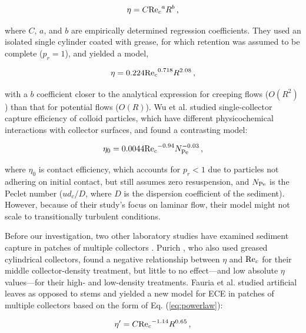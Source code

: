 \documentclass[geosciences,article,submit,moreauthors,pdftex]{Definitions/mdpi}
\begin{document}
\begin{equation}
    \eta=C{\mathrm{Re}_c}^{a}R^{b}\,,
    \label{eq:powerlaw}
\end{equation}

\noindent where $C$, $a$, and $b$ are empirically determined regression coefficients. They used an isolated single cylinder coated with grease, for which retention was assumed to be complete ($p_r = 1$), and yielded a model,

\begin{equation}
    \eta=0.224{\mathrm{Re}_c}^{0.718}R^{2.08}\,,
    \label{eq:palmer}
\end{equation}

\noindent with a $b$ coefficient closer to the analytical expression for creeping flows ($O(R^2)$) than that for potential flows ($O(R)$). Wu et al. \cite{Wu_2011} studied single-collector capture efficiency of colloid particles, which have different physicochemical interactions with collector surfaces, and found a contrasting model:

\begin{equation}
    \eta_0=0.0044{\mathrm{Re}_c}^{-0.94}N_{\mathrm{Pe}}^{-0.03}\,,
    \label{eq:wu}
\end{equation}

\noindent where $\eta_0$ is contact efficiency, which accounts for $p_r < 1$ due to particles not adhering on initial contact, but still assumes zero resuspension, and $N_{\mathrm{Pe}}$ is the Peclet number ($ud_c/D$, where $D$ is the dispersion coefficient of the sediment). However, because of their study's focus on laminar flow, their model might not scale to transitionally turbulent conditions.

Before our investigation, two other laboratory studies have examined sediment capture in patches of multiple collectors \cite{purich2006capture,Fauria_2015}. Purich \cite{purich2006capture}, who also used greased cylindrical collectors, found a negative relationship between $\eta$ and $\mathrm{Re}_c$ for their middle collector-density treatment, but little to no effect---and low absolute $\eta$ values---for their high- and low-density treatments. Fauria et al. \cite{Fauria_2015} studied artificial leaves as opposed to stems and yielded a new model for ECE in patches of multiple collectors based on the form of Eq. (\ref{eq:powerlaw}):

\begin{equation}
    \eta^\prime=C{\mathrm{Re}_c}^{-1.14}R^{0.65}\,,
    \label{eq:fauria}
\end{equation}
\end{document}
